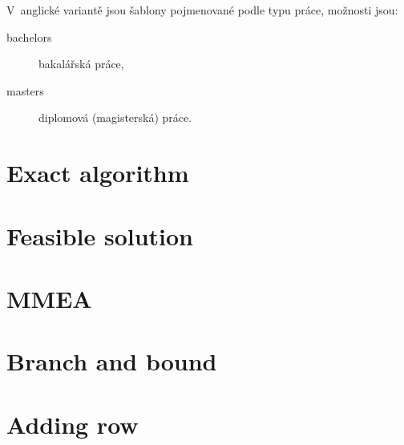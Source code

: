 V~anglické variantě jsou šablony pojmenované podle typu práce, možnosti jsou:
\begin{description}
	\item[bachelors] bakalářská práce,
	\item[masters] diplomová (magisterská) práce.
\end{description}

\section{Exact algorithm}
\section{Feasible solution}
\section{MMEA}
\section{Branch and bound}
\section{Adding row}
